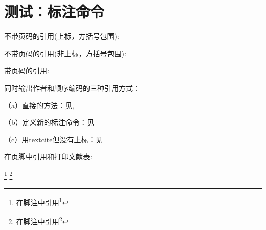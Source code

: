 \documentclass[twoside]{article}
\begin{document}
    \section{测试：标注命令}
    \begin{refsection}
     不带页码的引用(上标，方括号包围):
     \cite{FOURNEY1971-17-38}\cite{wang2006another}

     不带页码的引用(非上标，方括号包围):
     \parencite{FOURNEY1971-17-38}\parencite{wang2006another}

     带页码的引用:
     \cite[见][49页]{FOURNEY1971-17-38} \parencite[见][49页]{wang2006another}


     同时输出作者和顺序编码的三种引用方式：

    （a）直接的方法：见\citeauthor{FOURNEY1971-17-38}\cite{FOURNEY1971-17-38}, \citeauthor{wang2006another}\cite{wang2006another}

    （b）定义新的标注命令：见

    （c）用textcite但没有上标：见\textcite{FOURNEY1971-17-38,wang2006another}

     在页脚中引用和打印文献表:

     \footnote{在脚注中引用\footcite{FOURNEY1971-17-38}} 
     \footnote{在脚注中引用\footcite{wang2006another}} 

    \printbibliography
    \end{refsection}

    
\end{document}

